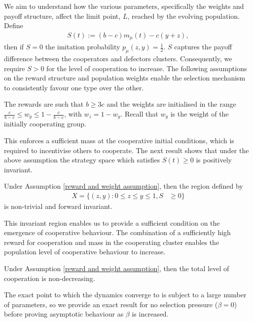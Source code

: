 \documentclass[10pt]{article}
\begin{document}
We aim to understand how the various parameters, specifically the weights and payoff structure, affect the limit point, $L$, reached by the evolving population. Define
\begin{align*}
    S(t):= (b-c)m_\mu(t) - c(y+z),
\end{align*}
then if $S = 0$ the imitation probability $p_\mu(z,y) = \frac{1}{2}$. $S$ captures the payoff difference between the cooperators and defectors clusters. Consequently, we require $S>0$ for the level of cooperation to increase. The following assumptions on the reward structure and population weights enable the selection mechanism to consistently favour one type over the other. 

\begin{assumption}\label{reward and weight assumption}
    The rewards are such that $b\geq 3c$ and the weights are initialised in the range $
    \frac{c}{b-c} \leq w_y \leq 1- \frac{c}{b-c}$, with $w_z = 1-w_y$. Recall that $w_y$ is the weight of the initially cooperating group.
\end{assumption}
This enforces a sufficient mass at the cooperative initial conditions, which is required to incentivise others to cooperate. The next result shows that under the above assumption the strategy space which satisfies $S(t)\geq0$ is positively invariant.
\begin{lemma}\label{lem: S_mu forward invariant}
Under Assumption \ref{reward and weight assumption}, then the region defined by
\begin{align*}
    X = \{(z,y) : 0 \leq z \leq y \leq 1, S &\geq 0 \}
\end{align*}
is non-trivial and forward invariant.
\end{lemma}
This invariant region enables us to provide a sufficient condition on the emergence of cooperative behaviour. The combination of a sufficiently high reward for cooperation and mass in the cooperating cluster enables the population level of cooperative behaviour to increase.
\begin{proposition}\label{proposition: cooperation is non-decreasing}
   Under Assumption \ref{reward and weight assumption}, then the total level of cooperation is non-decreasing.
\end{proposition}
The exact point to which the dynamics converge to is subject to a large number of parameters, so we provide an exact result for no selection pressure ($\beta=0$) before proving asymptotic behaviour as $\beta$ is increased.
\end{document}
